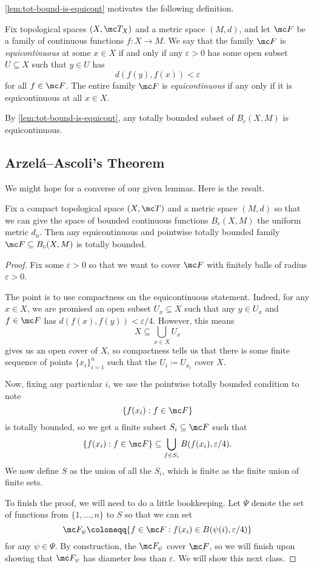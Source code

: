 \documentclass[../notes.tex]{subfiles}
\begin{document}
\autoref{lem:tot-bound-is-equicont} motivates the following definition.
\begin{definition}[Equicontinuous]
	Fix topological spaces $(X,\mc T_X)$ and a metric space $(M,d)$, and let $\mc F$ be a family of continuous functions $f\colon X\to M$. We say that the family $\mc F$ is \textit{equicontinuous} at some $x\in X$ if and only if any $\varepsilon>0$ has some open subset $U\subseteq X$ such that $y\in U$ has
	\[d(f(y),f(x))<\varepsilon\]
	for all $f\in \mc F$. The entire family $\mc F$ is \textit{equicontinuous} if any only if it is equicontinuous at all $x\in X$.
\end{definition}
\begin{example}
	By \autoref{lem:tot-bound-is-equicont}, any totally bounded subset of $B_c(X,M)$ is equicontinuous.
\end{example}

\subsection{Arzel\'a--Ascoli's Theorem}
We might hope for a converse of our given lemmas. Here is the result.
\begin{theorem}
	Fix a compact
	 topological space $(X,\mc T)$ and a metric space $(M,d)$ so that we can give the space of bounded continuous functions $B_c(X,M)$ the uniform metric $d_u$. Then any equicontinuous and pointwise totally bounded family $\mc F\subseteq B_c(X,M)$ is totally bounded.
\end{theorem}
\begin{proof}
	Fix some $\varepsilon>0$ so that we want to cover $\mc F$ with finitely balls of radius $\varepsilon>0$.
	
	The point is to use compactness on the equicontinuous statement. Indeed, for any $x\in X$, we are promised an open subset $U_x\subseteq X$ such that any $y\in U_x$ and $f\in\mc F$ has $d(f(x),f(y))<\varepsilon/4$. However, this means
	\[X\subseteq\bigcup_{x\in X}U_x\]
	gives us an open cover of $X$, so compactness tells us that there is some finite sequence of points $\{x_i\}_{i=1}^n$ such that the $U_i\coloneqq U_{x_i}$ cover $X$.

	Now, fixing any particular $i$, we use the pointwise totally bounded condition to note
	\[\{f(x_i):f\in\mc F\}\]
	is totally bounded, so we get a finite subset $S_i\subseteq\mc F$ such that
	\[\{f(x_i):f\in\mc F\}\subseteq\bigcup_{f\in S_i}B(f(x_i),\varepsilon/4).\]
	We now define $S$ as the union of all the $S_i$, which is finite as the finite union of finite sets.

	To finish the proof, we will need to do a little bookkeeping. Let $\Psi$ denote the set of functions from $\{1,\ldots,n\}$ to $S$ so that we can set
	\[\mc F_\psi\coloneqq\{f\in\mc F:f(x_i)\in B(\psi(i),\varepsilon/4)\}\]
	for any $\psi\in\Psi$. By construction, the $\mc F_\psi$ cover $\mc F$, so we will finish upon showing that $\mc F_\psi$ has diameter less than $\varepsilon$. We will show this next class.
\end{proof}
\end{document}
